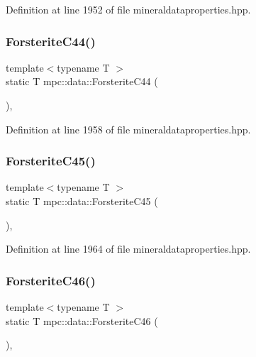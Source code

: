 Definition at line 1952 of file mineraldataproperties.\+hpp.

\mbox{\label{namespacempc_1_1data_ad78a38d622c8221eb739fa0cd0aa252a}} 
\subsubsection{\texorpdfstring{Forsterite\+C44()}{ForsteriteC44()}}
{\footnotesize\ttfamily template$<$typename T $>$ \\
static T mpc\+::data\+::\+Forsterite\+C44 (\begin{DoxyParamCaption}{ }\end{DoxyParamCaption})\hspace{0.3cm}{\ttfamily [inline]}, {\ttfamily [static]}}



Definition at line 1958 of file mineraldataproperties.\+hpp.

\mbox{\label{namespacempc_1_1data_aaa57264615454cacc2d61e61587d1403}} 
\subsubsection{\texorpdfstring{Forsterite\+C45()}{ForsteriteC45()}}
{\footnotesize\ttfamily template$<$typename T $>$ \\
static T mpc\+::data\+::\+Forsterite\+C45 (\begin{DoxyParamCaption}{ }\end{DoxyParamCaption})\hspace{0.3cm}{\ttfamily [inline]}, {\ttfamily [static]}}



Definition at line 1964 of file mineraldataproperties.\+hpp.

\mbox{\label{namespacempc_1_1data_ad58c63bc7e5446b77d4002ede6917bd7}} 
\subsubsection{\texorpdfstring{Forsterite\+C46()}{ForsteriteC46()}}
{\footnotesize\ttfamily template$<$typename T $>$ \\
static T mpc\+::data\+::\+Forsterite\+C46 (\begin{DoxyParamCaption}{ }\end{DoxyParamCaption})\hspace{0.3cm}{\ttfamily [inline]}, {\ttfamily [static]}}



